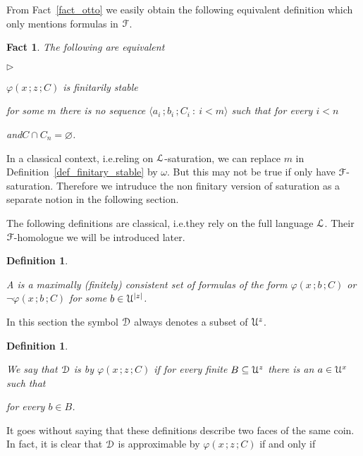 \documentclass{amsproc}
\newcommand{\mylabel}[1]{{#1}\hfill}
\renewenvironment{itemize}
  {\begin{list}{$\triangleright$}{%
  \setlength{\parskip}{0mm}
  \setlength{\topsep}{.1\baselineskip}
  \setlength{\rightmargin}{0mm}
  \setlength{\listparindent}{0mm}
  \setlength{\itemindent}{0mm}
  \setlength{\labelwidth}{3ex}
  \setlength{\itemsep}{.1\baselineskip}
  \setlength{\parsep}{.1\baselineskip}
  \setlength{\partopsep}{0mm}
  \setlength{\labelsep}{1ex}
  \setlength{\leftmargin}{\labelwidth+\labelsep}
  \let\makelabel\mylabel}}{%
\end{list}}
\newcounter{thm}
\theoremstyle{mio}
\newtheorem{fact}[thm]{Fact}\tcolorboxenvironment{fact}{mythm}
\newtheorem{definition}[thm]{Definition}\tcolorboxenvironment{definition}{mythm}
\renewcommand*{\emph}[1]{%
   \smash{\tikz[baseline]\node[rectangle, fill=teal!25, rounded corners, inner xsep=0.5ex, inner ysep=0.2ex, anchor=base, minimum height = 2.7ex]{\strut #1};}}
\begin{document}
From Fact~\ref{fact_otto} we easily obtain the following equivalent definition which only mentions formulas in ${\EuScript F}$.

\begin{fact}\label{fact_stability_semicalssic}
  The following are equivalent
  \begin{itemize}
    \item [1.]  $\varphi(x\,;z\,;C)$ is finitarily stable
    \item [2.]  for some $m$ there is no sequence $\langle a_i\,;b_i\,;C_i\ :\ i<m\rangle$ such that for every $i<n$\smallskip

    \quad and\quad $C\cap C_n=\varnothing$.
  \end{itemize}
\end{fact}

In a classical context, i.e.\@ reling on ${\EuScript L}$-saturation, we can replace $m$ in Definition~\ref{def_finitary_stable} by $\omega$.
But this may not be true if only have ${\EuScript F}$-saturation.
Therefore we intruduce the non finitary version of saturation as a separate notion in the following section.

The following definitions are classical, i.e.\@ they rely on the full language ${\EuScript L}$.
Their ${\EuScript F}$-homologue we will be introduced later.

\begin{definition}\label{def_globaltype}\strut
  A \emph{global $\varphi(x\,;z\,;C)$-type\/} is a maximally (finitely) consistent set of formulas of the form $\varphi(x\,;b\,;C)$ or $\neg\varphi(x\,;b\,;C)$ for some $b\in{\EuScript U}^{|z|}$.
\end{definition}

In this section the symbol ${\EuScript D}$ always denotes a subset of ${\EuScript U}^z$.

\begin{definition}\label{def_approx}\strut
  We say that ${\EuScript D}$ is \emph{approximable\/} by $\varphi(x\,;z\,;C)$ if for every finite $B\subseteq {\EuScript U}^z$ there is an $a\in {\EuScript U}^x$ such that\smallskip

  \hfill for every $b\in B$.
\end{definition}

It goes without saying that these definitions describe two faces of the same coin.
In fact, it is clear that ${\EuScript D}$ is approximable by $\varphi(x\,;z\,;C)$ if and only if  
    
\end{document}
